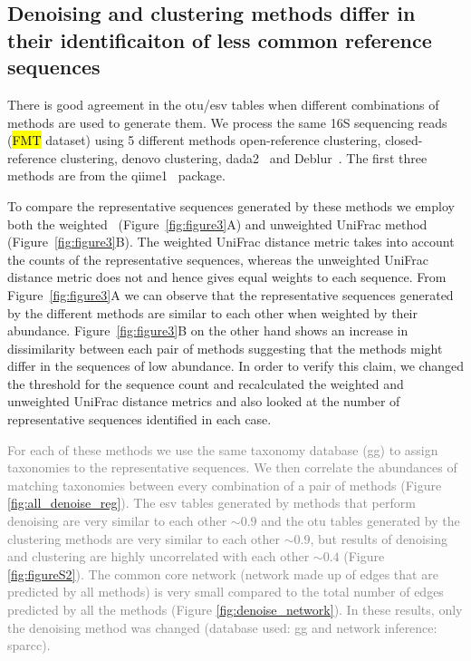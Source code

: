   \FloatBarrier

  \subsection*{Denoising and clustering methods differ in their identificaiton of less common reference sequences}

  There is good agreement in the \ac{otu}/\ac{esv} tables when different combinations of methods are used to generate them.
  We process the same 16S sequencing reads (\hl{FMT} dataset) using 5 different methods \- open-reference clustering, closed-reference clustering, denovo clustering, \ac{dada2}~\cite{Callahan2016} and Deblur~\cite{Amir2017}.
  The first three methods are from the \ac{qiime1}~\cite{Caporaso2010} package.

  To compare the representative sequences generated by these methods we employ both the weighted~\cite{Lozupone2007} (Figure~\ref{fig:figure3}A) and unweighted UniFrac method~\cite{Lozupone2005} (Figure~\ref{fig:figure3}B).
  The weighted UniFrac distance metric takes into account the counts of the representative sequences, whereas the unweighted UniFrac distance metric does not and hence gives equal weights to each sequence.
  From Figure~\ref{fig:figure3}A we can observe that the representative sequences generated by the different methods are similar to each other when weighted by their abundance.
  Figure~\ref{fig:figure3}B on the other hand shows an increase in dissimilarity between each pair of methods suggesting that the methods might differ in the sequences of low abundance.
  In order to verify this claim, we changed the threshold for the sequence count and recalculated the weighted and unweighted UniFrac distance metrics and also looked at the number of representative sequences identified in each case. 

  \textcolor{gray}{
    For each of these methods we use the same taxonomy database (\ac{gg}) to assign taxonomies to the representative sequences.
    We then correlate the abundances of matching taxonomies between every combination of a pair of methods (Figure \ref{fig:all_denoise_reg}).
    The \ac{esv} tables generated by methods that perform denoising are very similar to each other $\sim0.9$ and the \ac{otu} tables generated by the clustering methods are very similar to each other $\sim0.9$, but results of denoising and clustering are highly uncorrelated with each other $\sim0.4$ (Figure \ref{fig:figureS2}).
    The common core network (network made up of edges that are predicted by all methods) is very small compared to the total number of edges predicted by all the methods (Figure \ref{fig:denoise_network}).
    In these results, only the denoising method was changed (database used: \ac{gg} and network inference: \ac{sparcc}).
  }

